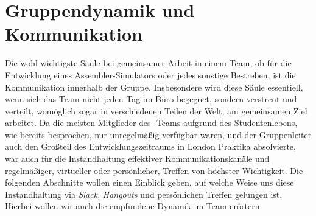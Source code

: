 
\section{Gruppendynamik und Kommunikation}
\label{team:group}

Die wohl wichtigste Säule bei gemeinsamer Arbeit in einem Team, ob für die
Entwicklung eines Assembler-Simulators oder jedes sonstige Bestreben, ist die
Kommunikation innerhalb der Gruppe. Insbesondere wird diese Säule essentiell,
wenn sich das Team nicht jeden Tag im Büro begegnet, sondern verstreut und
verteilt, womöglich sogar in verschiedenen Teilen der Welt, am gemeinsamen Ziel
arbeitet. Da die meisten Mitglieder des \erasim{}-Teams aufgrund des
Studentenlebens, wie bereits besprochen, nur unregelmäßig verfügbar waren, und
der Gruppenleiter auch den Großteil des Entwicklungszeitraums in London Praktika
absolvierte, war auch für \erasim{} die Instandhaltung effektiver
Kommunikationskanäle und regelmäßiger, virtueller oder persönlicher, Treffen von
höchster Wichtigkeit. Die folgenden Abschnitte wollen einen Einblick geben, auf
welche Weise uns diese Instandhaltung via \emph{Slack}, \emph{Hangouts} und
persönlichen Treffen gelungen ist. Hierbei wollen wir auch die empfundene
Dynamik im Team erörtern.






